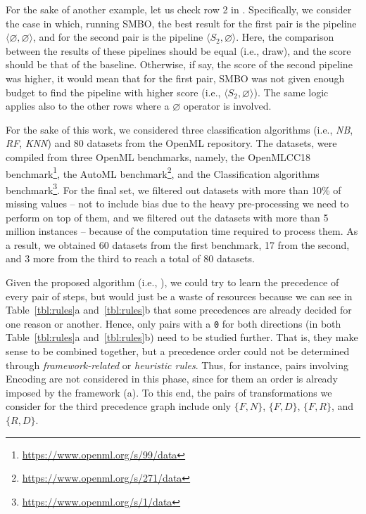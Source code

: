 For the sake of another example, let us check row 2 in .
Specifically, we consider the case in which, running SMBO, the best result for the first pair is the pipeline $\langle \varnothing, \varnothing \rangle$, and for the second pair is the pipeline $\langle S_2, \varnothing \rangle$.
Here, the comparison between the results of these pipelines should be equal (i.e., draw), and the score should be that of the baseline.
Otherwise, if say, the score of the second pipeline was higher, it would mean that for the first pair, SMBO was not given enough budget to find the pipeline with higher score (i.e., $\langle S_2, \varnothing \rangle$).
The same logic applies also to the other rows where a $\varnothing$ operator is involved.

\begin{example}
For the sake of this work, we considered three classification algorithms (i.e., \textit{NB}, \textit{RF},  \textit{KNN}) and $80$ datasets from the OpenML repository. The datasets, were compiled from three OpenML benchmarks, namely, the OpenMLCC18 benchmark\footnote{\url{https://www.openml.org/s/99/data}}, the AutoML benchmark\footnote{\url{https://www.openml.org/s/271/data}}, and the Classification algorithms benchmark\footnote{\url{https://www.openml.org/s/1/data}}.
For the final set, we filtered out datasets with more than 10\% of missing values -- not to include bias due to the heavy pre-processing we need to perform on top of them, and we filtered out the datasets with more than 5 million instances -- because of the computation time required to process them.
As a result, we obtained 60 datasets from the first benchmark, 17 from the second, and 3 more from the third to reach a total of 80 datasets.

Given the proposed algorithm (i.e., ), we could try to learn the precedence of every pair of steps, but would just be a waste of resources because we can see in Table~\ref{tbl:rules}a and~\ref{tbl:rules}b that some precedences are already decided for one reason or another.
Hence, only pairs with a \texttt{0} for both directions (in both Table~\ref{tbl:rules}a and~\ref{tbl:rules}b) need to be studied further.
That is, they make sense to be combined together, but a precedence order could not be determined through \textit{framework-related} or \textit{heuristic rules}. %
Thus, for instance, pairs involving Encoding are not considered in this phase, since for them an order is already imposed by the framework (a).
To this end, the pairs of transformations we consider for the third precedence graph include only $\{F,N\}$, $\{F,D\}$, $\{F,R\}$, and $\{R,D\}$.



\end{example}

